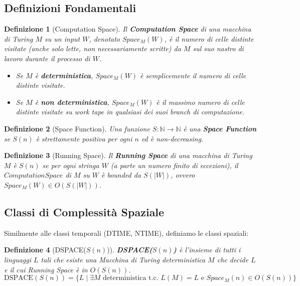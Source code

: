 \documentclass[a4paper]{article}
\newtheorem{definition}{Definizione}[section]
\begin{document}
\subsection{Definizioni Fondamentali}

\begin{definition}[Computation Space]
Il \textbf{Computation Space} di una macchina di Turing $M$ su un input $W$, denotato $Space_M(W)$, è il numero di celle \emph{distinte} visitate (anche solo lette, non necessariamente scritte) da $M$ sul suo \emph{nastro di lavoro} durante il processo di $W$.
\begin{itemize}
    \item Se $M$ è \textbf{deterministica}, $Space_M(W)$ è semplicemente il numero di celle distinte visitate.
    \item Se $M$ è \textbf{non deterministica}, $Space_M(W)$ è il \emph{massimo} numero di celle distinte visitate su work tape in qualsiasi dei suoi branch di computazione.
\end{itemize}
\end{definition}

\begin{definition}[Space Function]
Una funzione $S: \mathbb{N} \to \mathbb{N}$ è una \textbf{Space Function} se $S(n)$ è strettamente positiva per ogni $n$ ed è non-decreasing.
\end{definition}

\begin{definition}[Running Space]
Il \textbf{Running Space} di una macchina di Turing $M$ è $S(n)$ se per ogni stringa $W$ (a parte un numero finito di eccezioni), il $Computation Space$ di $M$ su $W$ è bounded da $S(|W|)$, ovvero $Space_M(W) \in O(S(|W|))$.
\end{definition}

\subsection{Classi di Complessità Spaziale}

Similmente alle classi temporali (DTIME, NTIME), definiamo le classi spaziali:

\begin{definition}[DSPACE($S(n)$)]
\textbf{DSPACE($S(n)$)} è l'insieme di tutti i linguaggi $L$ tali che esiste una Macchina di Turing deterministica $M$ che decide $L$ e il cui Running Space è in $O(S(n))$.
\[ \text{DSPACE}(S(n)) = \{ L \mid \exists M \text{ deterministica t.c. } L(M) = L \text{ e } Space_M(n) \in O(S(n)) \} \]
\end{definition}
\end{document}

